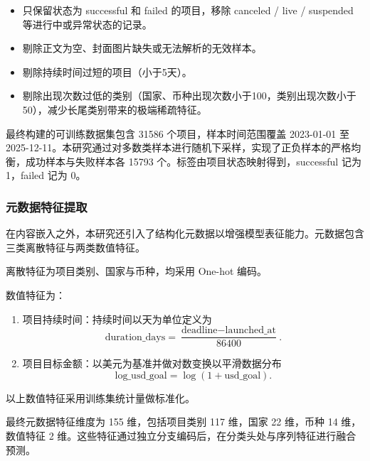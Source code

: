 \begin{itemize}
  \item 只保留状态为 successful 和 failed 的项目，移除 canceled / live / suspended 等进行中或异常状态的记录。
  \item 剔除正文为空、封面图片缺失或无法解析的无效样本。
  \item 剔除持续时间过短的项目（小于5天）。
  \item 剔除出现次数过低的类别（国家、币种出现次数小于100，类别出现次数小于50），减少长尾类别带来的极端稀疏特征。
\end{itemize}

最终构建的可训练数据集包含 31586 个项目，样本时间范围覆盖 2023-01-01 至 2025-12-11。本研究通过对多数类样本进行随机下采样，实现了正负样本的严格均衡，成功样本与失败样本各 15793 个。标签由项目状态映射得到，successful 记为 1，failed 记为 0。

\subsubsection{元数据特征提取}
在内容嵌入之外，本研究还引入了结构化元数据以增强模型表征能力。元数据包含三类离散特征与两类数值特征。

离散特征为项目类别、国家与币种，均采用 One-hot 编码。

数值特征为：

\begin{enumerate}[label=(\arabic*)]
  \item 项目持续时间：持续时间以天为单位定义为
  \begin{equation}
  \text{duration\_days}=\frac{\text{deadline}-\text{launched\_at}}{86400}.
  \end{equation}
  \item 项目目标金额：以美元为基准并做对数变换以平滑数据分布
  \begin{equation}
  \text{log\_usd\_goal}=\log(1+\text{usd\_goal}).
  \end{equation}
\end{enumerate}

以上数值特征采用训练集统计量做标准化。

最终元数据特征维度为 155 维，包括项目类别 117 维，国家 22 维，币种 14 维，数值特征 2 维。这些特征通过独立分支编码后，在分类头处与序列特征进行融合预测。



